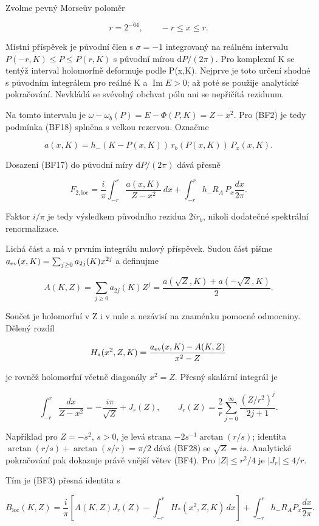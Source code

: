 \documentclass[11pt,a4paper]{article}
\theoremstyle{remark}\newtheorem{remark}[theorem]{Poznámka}
\numberwithin{equation}{section}
\begin{document}
Zvolme pevný Morseův poloměr

\[
r=2^{-64},\qquad -r\le x\le r.
\tag{BF25}
\]

Místní příspěvek je původní člen s \(\sigma=-1\) integrovaný na reálném
intervalu \(P(-r,K)\le P\le P(r,K)\) s původní mírou
\(\mathrm dP/(2\pi)\). Pro komplexní K se tentýž interval holomorfně
deformuje podle P(x,K). Nejprve je toto určení shodné s původním
integrálem pro reálné K a \(\operatorname{Im}E>0\); až poté se použije
analytické pokračování. Nevkládá se svévolný obchvat pólu ani se
nepřičítá reziduum.

Na tomto intervalu je \(\omega-\omega_b(P)=E-\Phi(P,K)=Z-x^2\). Pro
(BF2) je tedy podmínka (BF18) splněna s velkou rezervou. Označme

\[
a(x,K)=h_-(K-P(x,K))\,r_b(P(x,K))\,P_x(x,K).
\tag{BF26}
\]

Dosazení (BF17) do původní míry \(\mathrm dP/(2\pi)\) dává přesně

\[
F_{2,\mathrm{loc}}
=\frac{i}{\pi}\int_{-r}^r\frac{a(x,K)}{Z-x^2}\,dx
+\int_{-r}^r
h_-R_A\,P_x\frac{dx}{2\pi}.
\tag{BF27}
\]

Faktor \(i/\pi\) je tedy výsledkem původního rezidua \(2ir_b\), nikoli
dodatečné spektrální renormalizace.

Lichá část a má v prvním integrálu nulový příspěvek. Sudou část pišme
\(a_{\rm ev}(x,K)=\sum_{j\ge0}a_{2j}(K)x^{2j}\) a definujme

\[
A(K,Z)=\sum_{j\ge0}a_{2j}(K)Z^j
=\frac{a(\sqrt Z,K)+a(-\sqrt Z,K)}2.
\]

Součet je holomorfní v Z i v nule a nezávisí na znaménku pomocné
odmocniny. Dělený rozdíl

\[
H_*(x^2,Z,K)=\frac{a_{\rm ev}(x,K)-A(K,Z)}{x^2-Z}
\]

je rovněž holomorfní včetně diagonály \(x^2=Z\). Přesný skalární
integrál je

\[
\int_{-r}^r\frac{dx}{Z-x^2}
=-\frac{i\pi}{\sqrt Z}+J_r(Z),\qquad
J_r(Z)=\frac2r\sum_{j=0}^{\infty}
\frac{(Z/r^2)^j}{2j+1}.
\tag{BF28}
\]

Například pro \(Z=-s^2\), \(s>0\), je levá strana
\(-2s^{-1}\arctan(r/s)\); identita \(\arctan(r/s)+\arctan(s/r)=\pi/2\)
dává (BF28) se \(\sqrt Z=is\). Analytické pokračování pak dokazuje právě
vnější větev (BF4). Pro \(|Z|\le r^2/4\) je \(|J_r|\le4/r\).

Tím je (BF3) přesná identita s

\[
B_{\mathrm{loc}}(K,Z)=\frac i\pi
\left[A(K,Z)J_r(Z)-\int_{-r}^rH_*(x^2,Z,K)\,dx\right]
+\int_{-r}^r h_-R_A P_x\frac{dx}{2\pi}.
\tag{BF29}
\]
\end{document}
